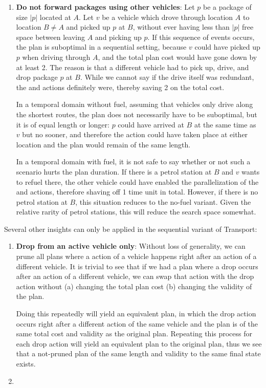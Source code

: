 \begin{enumerate}
\item \textbf{Do not forward packages using other vehicles}:
Let $p$ be a package of size $|p|$ located at $A$.
Let $v$ be a vehicle which drove through location $A$ to location $B \neq A$
and picked up $p$ at $B$,
without ever having less than $|p|$ free space between leaving $A$ and picking up $p$.
If this sequence of events occurs, the plan is suboptimal in a sequential setting, because
$v$ could have picked up $p$ when driving through $A$, and the total plan cost
would have gone down by at least 2. The reason is that a different vehicle had to pick up, drive, and drop package $p$ at $B$.
While we cannot say if the drive itself
was redundant, the \pickup{} and \drop{} actions definitely were, thereby saving
2 on the total cost. 

In a temporal domain without fuel, assuming that vehicles only drive along the shortest routes,
the plan does not necessarily have to be suboptimal, but it
is of equal length or longer: $p$ could have arrived at $B$ at the same time as $v$ but no sooner, and therefore the \pickup{} action could have taken place at either location and the plan would remain of the same length. 

In a temporal domain with fuel, it is not safe to say whether or not
such a scenario hurts the plan duration. If there is a petrol station at $B$
and $v$ wants to refuel there, the other vehicle could have enabled the parallelization 
of the  and \pickup{} actions, therefore shaving off 1 time unit in total.
However, if there is no petrol
station at $B$, this situation reduces to the no-fuel variant. Given the relative rarity of petrol stations, this will reduce the search space somewhat.
\end{enumerate}
Several other insights can only be applied in the sequential variant of Transport:
\begin{enumerate}
\item \textbf{Drop from an active vehicle only}: Without loss of generality,
we can prune all plans where a \drop{} action of a vehicle happens
right after an action of a different vehicle. It is trivial to see that if we had a plan where a drop
occurs after an action of a different vehicle, we can swap that action with the drop
action without (a) changing the total plan cost (b) changing the validity of the plan.

Doing this repeatedly will yield an equivalent plan, in which the drop action
occurs right after a different action of the same vehicle and the plan is of the same total cost and validity as the original plan. Repeating this process for each drop action will yield an equivalent plan to the original plan, thus we see that a not-pruned plan of the same length and validity to the same final state exists.

\item \textbf{}
\end{enumerate}
